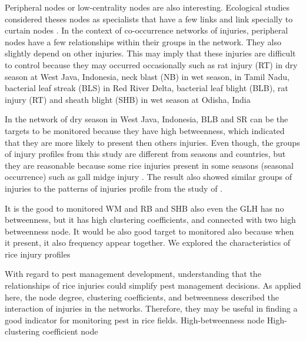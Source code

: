 Peripheral nodes or low-centrality nodes are also interesting. Ecological studies considered theses nodes as  specialists that have a few links and link specially to curtain nodes \citep{Lu_2013_Soil, Borthagaray_2014_Inferring}. In the context of co-occurrence networks of injuries, peripheral nodes have a few relationships within their groups in the network. They also slightly depend on other injuries. This may imply that these injuries are difficult to control because they may occurred occasionally such as rat injury (RT) in dry season at West Java, Indonesia, neck blast (NB) in wet season, in Tamil Nadu, bacterial leaf streak (BLS) in Red  River Delta, bacterial leaf blight (BLB), rat injury (RT) and sheath blight (SHB) in wet season at Odisha, India

In the network of dry season in West Java, Indonesia, BLB and SR can be the targets to be monitored because they have high betweenness, which indicated that they are more likely to present then others injuries. Even though, the groups of injury profiles from this study are different from seasons and countries, but they are reasonable because some rice injuries present in some seasons (seasonal occurrence) such as gall midge injury \cite{Krishnaiah_2004_Rice}. The result also showed similar groups of injuries to the patterns of injuries profile from the study of \cite{Savary_2000_Characterization}. 


It is the good to monitored WM and RB and SHB also even the GLH has no betweenness, but it has high clustering coefficients, and connected with two high betweenness node. It would be also good target to monitored also because when it present, it also frequency appear together.
We explored the characteristics of rice injury profiles

With regard to pest management development, understanding that the relationships of rice injuries could simplify pest management decisions. As applied here, the node degree, clustering coefficients, and betweenness described the interaction of injuries in the networks. Therefore, they may be useful in finding a good indicator for monitoring pest in rice fields. High-betweenness node High- clustering coefficient node 

